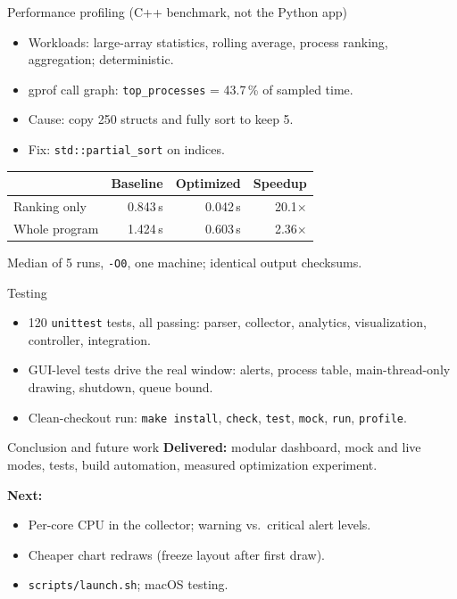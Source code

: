 \documentclass[aspectratio=169,10pt]{beamer}
\begin{document}
\begin{frame}{Performance profiling (C++ benchmark, not the Python app)}
\begin{itemize}
  \item Workloads: large-array statistics, rolling average, process ranking, aggregation; deterministic.
  \item gprof call graph: \texttt{top\_processes} = 43.7\,\% of sampled time.
  \item Cause: copy 250 structs and fully sort to keep 5.
  \item Fix: \texttt{std::partial\_sort} on indices.
\end{itemize}
\medskip
\begin{tabular}{lrrr}
\toprule & Baseline & Optimized & Speedup \\ \midrule
Ranking only & 0.843\,s & 0.042\,s & 20.1$\times$ \\
Whole program & 1.424\,s & 0.603\,s & 2.36$\times$ \\ \bottomrule
\end{tabular}

{\footnotesize Median of 5 runs, \texttt{-O0}, one machine; identical output checksums.}
\end{frame}

\begin{frame}{Testing}
\begin{itemize}
  \item 120 \texttt{unittest} tests, all passing: parser, collector, analytics, visualization, controller, integration.
  \item GUI-level tests drive the real window: alerts, process table, main-thread-only drawing, shutdown, queue bound.
  \item Clean-checkout run: \texttt{make install}, \texttt{check}, \texttt{test}, \texttt{mock}, \texttt{run}, \texttt{profile}.
\end{itemize}
\end{frame}

\begin{frame}{Conclusion and future work}
\textbf{Delivered:} modular dashboard, mock and live modes, tests, build automation, measured optimization experiment.
\medskip

\textbf{Next:}
\begin{itemize}
  \item Per-core CPU in the collector; warning vs.\ critical alert levels.
  \item Cheaper chart redraws (freeze layout after first draw).
  \item \texttt{scripts/launch.sh}; macOS testing.
\end{itemize}
\end{frame}
\end{document}
